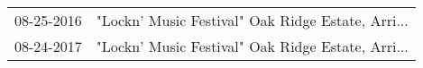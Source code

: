 \begin{supertabular}{ll}
 08-25-2016 &  "Lockn' Music Festival" Oak Ridge Estate, Arri... \\
 08-24-2017 &  "Lockn' Music Festival" Oak Ridge Estate, Arri... \\
\end{supertabular}
